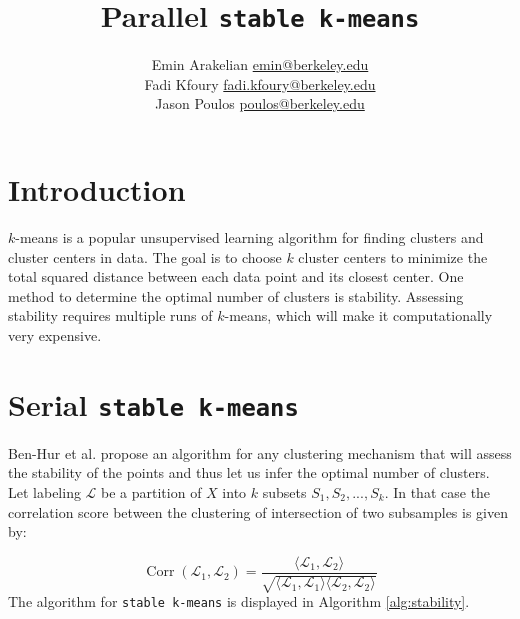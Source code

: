 \documentclass[a0paper,smallertitle]{HYposter}
\title{\hspace{20mm}Parallel \texttt{stable k-means}}
\author{Emin Arakelian \hspace{5mm}  \url{emin@berkeley.edu}  \\
Fadi Kfoury \hspace{5mm}  \url{fadi.kfoury@berkeley.edu}  \\
Jason Poulos \hspace{5mm}  \url{poulos@berkeley.edu}  }
\affiliation{}
\DeclareMathOperator{\Corr}{Corr}
\begin{document}
\section*{Introduction} \label{section:Intro}

$k$-means is a popular unsupervised learning algorithm for finding clusters and cluster centers in data. The goal is to choose $k$ cluster centers to minimize the total squared distance between each data point and its closest center. One method to determine the optimal number of clusters is stability. Assessing stability requires multiple runs of $k$-means, which will make it computationally very expensive.


\section*{Serial \texttt{stable k-means}} \label{section:stable}
Ben-Hur et al.\cite{ben2001} propose an algorithm for any clustering mechanism that will assess the stability of the points and thus let us infer the optimal number of clusters. %
%
Let labeling $\mathcal{L}$ be a partition of $X$ into $k$ subsets $S_1, S_2, ... , S_k$. In that case the correlation score between the clustering of intersection of two subsamples is given by: 

\[
\Corr(\mathcal{L}_1, \mathcal{L}_2) = \frac{\langle \mathcal{L}_1, \mathcal{L}_2 \rangle}{\sqrt{\langle \mathcal{L}_1,\mathcal{L}_1\rangle \langle \mathcal{L}_2,\mathcal{L}_2\rangle}}
\] The algorithm for \texttt{stable k-means} is displayed in Algorithm \ref{alg:stability}.
\end{document}
